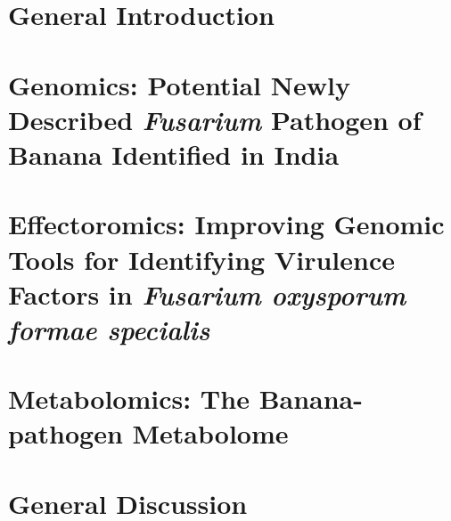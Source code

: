 \documentclass[11pt, a4paper, titles]{report}  %
\begin{document}
\clearpage

\setcounter{secnumdepth}{2}

      
\renewcommand{\arraystretch}{1.5} %

    
\chapter{General Introduction}\label{Chap1}
    
\chapter{Genomics: Potential Newly Described \textit{Fusarium} Pathogen of Banana Identified in India}\label{Chap2}
    
\chapter{Effectoromics: Improving Genomic Tools for Identifying Virulence Factors in  \textit{Fusarium oxysporum formae specialis}}\label{Chap3}
     
    
\chapter{Metabolomics: The Banana-pathogen Metabolome}\label{Chap4}

\chapter{General Discussion}\label{Chap5}

\end{document}
